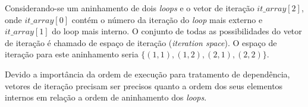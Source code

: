 Considerando-se um aninhamento de dois \textit{loops} e o vetor de iteração
$it\_array[2]$, onde $it\_array[0]$ contém o número da iteração do \textit{loop}
mais externo e $it\_array[1]$ do loop mais interno. 
O conjunto de todas as possibilidades do vetor de iteração é chamado de espaço 
de iteração (\textit{iteration space}). 
O espaço de iteração para este aninhamento seria $\{(1,1),(1,2),(2,1),(2,2)\}$.

Devido a importância da ordem de execução para tratamento de dependência,
vetores de iteração precisam ser precisos quanto a ordem dos seus elementos
internos em relação a ordem de aninhamento dos \textit{loops}. 










